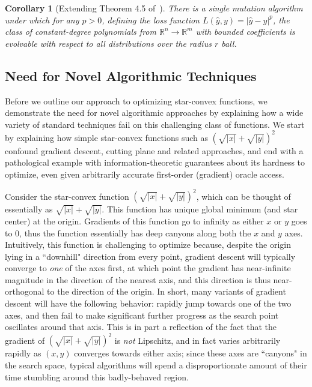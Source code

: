 \documentclass[11pt,letter]{article}
\newcounter{nTheorems}
\numberwithin{nTheorems}{section}
\newtheorem{corollary}[nTheorems]{Corollary}
\begin{document}
\begin{corollary}[Extending Theorem 4.5 of~\cite{Valiant:2014}]
There is a single mutation algorithm under which for any $p>0$, defining the loss function $L(\hat{y},y)=|\hat{y}-y|^p$, the class of constant-degree polynomials from $\mathbb{R}^n\rightarrow\mathbb{R}^m$ with bounded coefficients is evolvable with respect to all distributions over the radius $r$ ball.
\end{corollary}



\subsection{Need for Novel Algorithmic Techniques}
\label{sect:Hardness}

Before we outline our approach to optimizing star-convex functions, we demonstrate the need for novel algorithmic approaches by explaining how a wide variety of standard techniques fail on this challenging class of functions. We start by explaining how simple star-convex functions such as $(\sqrt{|x|}+\sqrt{|y|})^2$ confound gradient descent, cutting plane and related approaches, and end with a pathological example with information-theoretic guarantees about its hardness to optimize, even given arbitrarily accurate first-order (gradient) oracle access.

Consider the star-convex function $(\sqrt{|x|}+\sqrt{|y|})^2$, which can be thought of essentially as $\sqrt{|x|}+\sqrt{|y|}$. This function has unique global minimum (and star center) at the origin. Gradients of this function go to infinity as either $x$ or $y$ goes to 0, thus the function essentially has deep canyons along both the $x$ and $y$ axes. Intuitively, this function is challenging to optimize because, despite the origin lying in a ``downhill" direction from every point, gradient descent will typically converge to \emph{one} of the axes first, at which point the gradient has near-infinite magnitude in the direction of the nearest axis, and this direction is thus near-orthogonal to the direction of the origin. In short, many variants of gradient descent will have the following behavior: rapidly jump towards one of the two axes, and then fail to make significant further progress as the search point oscillates around that axis. This is in part a reflection of the fact that the gradient of $(\sqrt{|x|}+\sqrt{|y|})^2$ is \emph{not} Lipschitz, and in fact varies arbitrarily rapidly as $(x,y)$ converges towards either axis; since these axes are ``canyons" in the search space, typical algorithms will spend a disproportionate amount of their time stumbling around this badly-behaved region.
\end{document}
